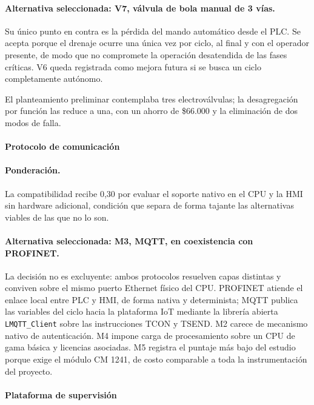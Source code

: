 \paragraph{Alternativa seleccionada: V7, válvula de bola manual de 3 vías.} Su único punto en contra es la pérdida del mando automático desde el PLC. Se acepta porque el drenaje ocurre una única vez por ciclo, al final y con el operador presente, de modo que no compromete la operación desatendida de las fases críticas. V6 queda registrada como mejora futura si se busca un ciclo completamente autónomo.



El planteamiento preliminar contemplaba tres electroválvulas; la desagregación por función las reduce a una, con un ahorro de \$66.000 y la eliminación de dos modos de falla.

\paragraph{Protocolo de comunicación}



\paragraph{Ponderación.} La compatibilidad recibe 0,30 por evaluar el soporte nativo en el CPU y la HMI sin hardware adicional, condición que separa de forma tajante las alternativas viables de las que no lo son.

\paragraph{Alternativa seleccionada: M3, MQTT, en coexistencia con PROFINET.} La decisión no es excluyente: ambos protocolos resuelven capas distintas y conviven sobre el mismo puerto Ethernet físico del CPU. PROFINET atiende el enlace local entre PLC y HMI, de forma nativa y determinista; MQTT publica las variables del ciclo hacia la plataforma IoT mediante la librería abierta \texttt{LMQTT\_Client} sobre las instrucciones TCON y TSEND. M2 carece de mecanismo nativo de autenticación. M4 impone carga de procesamiento sobre un CPU de gama básica y licencias asociadas. M5 registra el puntaje más bajo del estudio porque exige el módulo CM 1241, de costo comparable a toda la instrumentación del proyecto.

\paragraph{Plataforma de supervisión}

